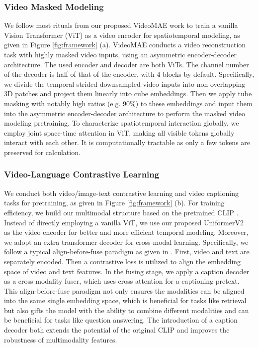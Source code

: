 	\subsubsection{Video Masked Modeling}
	
	We follow most rituals from our proposed VideoMAE \cite{videomae} work to train a vanilla Vision Transformer (ViT) as a video encoder for spatiotemporal modeling, as given in Figure \ref{fig:framework} (a). VideoMAE conducts a video reconstruction task with highly masked video inputs, using an asymmetric encoder-decoder architecture. The used encoder and decoder are both ViTs. The channel number of the decoder is half of that of the encoder, with 4 blocks by default. Specifically, we divide the temporal strided downsampled video inputs into non-overlapping 3D patches and project them linearly into cube embeddings. Then we apply tube masking with notably high ratios (e.g. 90\%) to these embeddings and input them into the asymmetric encoder-decoder architecture to perform the masked video modeling pretraining. To characterize spatiotemporal interaction globally, we employ joint space-time attention \cite{arnab2021vivit,liu2022video} in ViT, making all visible tokens globally interact with each other. It is computationally tractable as only a few tokens are preserved for calculation. %
	
	
	\subsubsection{Video-Language Contrastive Learning}
	
	We conduct both video/image-text contrastive learning and video captioning tasks for pretraining, as given in Figure \ref{fig:framework} (b). 
	For training efficiency,
	we build our multimodal structure based on the pretrained CLIP \cite{CLIP}. Instead of directly employing a vanilla ViT, we use our proposed UniformerV2~\citep{uniformerv2}  as the video encoder for better and more efficient temporal modeling. Moreover, we adopt an extra transformer decoder for cross-modal learning. 
	Specifically, we follow a typical align-before-fuse paradigm as given in \cite{coca,li2021align}. 
	First, video and text are separately encoded. Then a contrastive loss is utilized to align the embedding space of video and text features. In the fusing stage, we apply a caption decoder as a cross-modality fuser, which uses cross attention for a captioning pretext. This align-before-fuse paradigm not only ensures the modalities can be aligned into the same single embedding space, which is beneficial for tasks like retrieval but also gifts the model with the ability to combine different modalities and can be beneficial for tasks like question answering. The introduction of a caption decoder both extends the potential of the original CLIP and improves the robustness of multimodality features.
	
